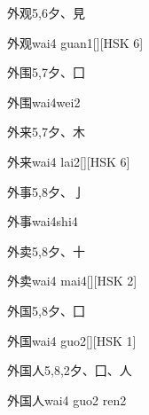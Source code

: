 \begin{Entry}{外观}{5,6}{⼣、⾒}
  \begin{Phonetics}{外观}{wai4 guan1}[][HSK 6]
  \end{Phonetics}
\end{Entry}

\begin{Entry}{外围}{5,7}{⼣、⼞}
  \begin{Phonetics}{外围}{wai4wei2}
  \end{Phonetics}
\end{Entry}

\begin{Entry}{外来}{5,7}{⼣、⽊}
  \begin{Phonetics}{外来}{wai4 lai2}[][HSK 6]
  \end{Phonetics}
\end{Entry}

\begin{Entry}{外事}{5,8}{⼣、⼅}
  \begin{Phonetics}{外事}{wai4shi4}
  \end{Phonetics}
\end{Entry}

\begin{Entry}{外卖}{5,8}{⼣、⼗}
  \begin{Phonetics}{外卖}{wai4 mai4}[][HSK 2]
  \end{Phonetics}
\end{Entry}

\begin{Entry}{外国}{5,8}{⼣、⼞}
  \begin{Phonetics}{外国}{wai4 guo2}[][HSK 1]
  \end{Phonetics}
\end{Entry}

\begin{Entry}{外国人}{5,8,2}{⼣、⼞、⼈}
  \begin{Phonetics}{外国人}{wai4 guo2 ren2}
  \end{Phonetics}
\end{Entry}

